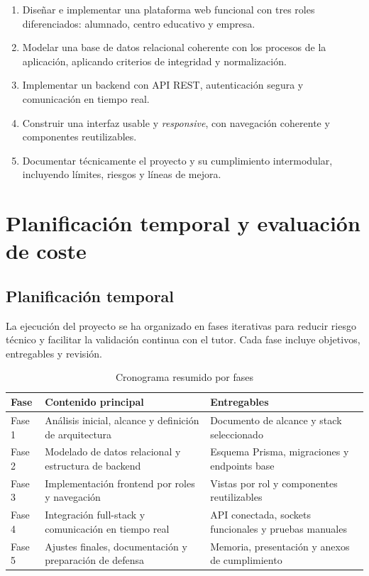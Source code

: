 \documentclass[12pt, a4paper]{report}
\begin{document}
\begin{enumerate}
  \item Diseñar e implementar una plataforma web funcional con tres roles diferenciados: alumnado,
    centro educativo y empresa.
  \item Modelar una base de datos relacional coherente con los procesos de la aplicación, aplicando
    criterios de integridad y normalización.
  \item Implementar un backend con API REST, autenticación segura y comunicación en tiempo real.
  \item Construir una interfaz usable y \emph{responsive}, con navegación coherente y componentes
    reutilizables.
  \item Documentar técnicamente el proyecto y su cumplimiento intermodular, incluyendo límites,
    riesgos y líneas de mejora.
\end{enumerate}

\chapter{Planificación temporal y evaluación de coste}

\section{Planificación temporal}

La ejecución del proyecto se ha organizado en fases iterativas para reducir riesgo técnico y facilitar
la validación continua con el tutor. Cada fase incluye objetivos, entregables y revisión.

\begin{table}[H]
  \centering
  \caption{Cronograma resumido por fases}
  \begin{tabularx}{\textwidth}{lXX}
    \toprule
    \textbf{Fase} & \textbf{Contenido principal} & \textbf{Entregables} \\
    \midrule
    Fase 1 & Análisis inicial, alcance y definición de arquitectura & Documento de alcance y stack seleccionado \\
    \addlinespace
    Fase 2 & Modelado de datos relacional y estructura de backend & Esquema Prisma, migraciones y endpoints base \\
    \addlinespace
    Fase 3 & Implementación frontend por roles y navegación & Vistas por rol y componentes reutilizables \\
    \addlinespace
    Fase 4 & Integración full-stack y comunicación en tiempo real & API conectada, sockets funcionales y pruebas manuales \\
    \addlinespace
    Fase 5 & Ajustes finales, documentación y preparación de defensa & Memoria, presentación y anexos de cumplimiento \\
    \bottomrule
  \end{tabularx}
\end{table}
\end{document}
